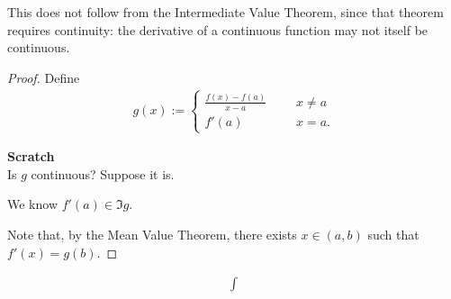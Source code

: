 \documentclass[12pt]{article}
\begin{document}
\begin{remark*}
  This does not follow from the Intermediate Value Theorem, since that theorem requires continuity:
  the derivative of a continuous function may not itself be continuous.
\end{remark*}

\begin{proof}
  Define
  \begin{align*}
    g(x) :=
    \begin{cases}
      \frac{f(x) - f(a)}{x - a} ~~~~~~~ &x \neq a\\
      f'(a) ~~~~~~~ &x = a.
    \end{cases}
  \end{align*}

  {\bf Scratch}\\
  Is $g$ continuous? Suppose it is.

  We know $f'(a) \in \Im g$.



  Note that, by the Mean Value Theorem, there exists $x \in (a, b)$ such that $f'(x) = g(b)$.


\end{proof}

\begin{align*}
  \int
\end{align*}
\end{document}

